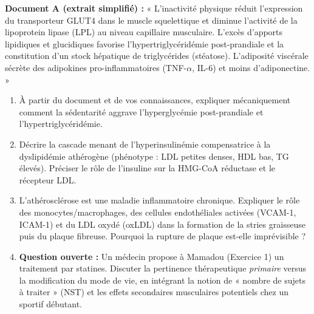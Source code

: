 \documentclass[11pt]{article}
\begin{document}
\begin{exercice}
\textbf{Document A (extrait simplifié) :} « L'inactivité physique réduit l'expression du transporteur GLUT4 dans le muscle squelettique et diminue l'activité de la lipoprotein lipase (LPL) au niveau capillaire musculaire. L'excès d'apports lipidiques et glucidiques favorise l'hypertriglycéridémie post-prandiale et la constitution d'un stock hépatique de triglycérides (stéatose). L'adiposité viscérale sécrète des adipokines pro-inflammatoires (TNF-$\alpha$, IL-6) et moins d'adiponectine. »
\begin{enumerate}
    \item À partir du document et de vos connaissances, expliquer mécaniquement comment la sédentarité aggrave l'hyperglycémie post-prandiale et l'hypertriglycéridémie.
    \item Décrire la cascade menant de l'hyperinsulinémie compensatrice à la dyslipidémie athérogène (phénotype : LDL petites denses, HDL bas, TG élevés). Préciser le rôle de l'insuline sur la HMG-CoA réductase et le récepteur LDL.
    \item L'athérosclérose est une maladie inflammatoire chronique. Expliquer le rôle des monocytes/macrophages, des cellules endothéliales activées (VCAM-1, ICAM-1) et du LDL oxydé (oxLDL) dans la formation de la stries graisseuse puis du plaque fibreuse. Pourquoi la rupture de plaque est-elle imprévisible ?
    \item \textbf{Question ouverte :} Un médecin propose à Mamadou (Exercice 1) un traitement par statines. Discuter la pertinence thérapeutique \textit{primaire} versus la modification du mode de vie, en intégrant la notion de « nombre de sujets à traiter » (NST) et les effets secondaires musculaires potentiels chez un sportif débutant.
\end{enumerate}
\end{exercice}
\end{document}
